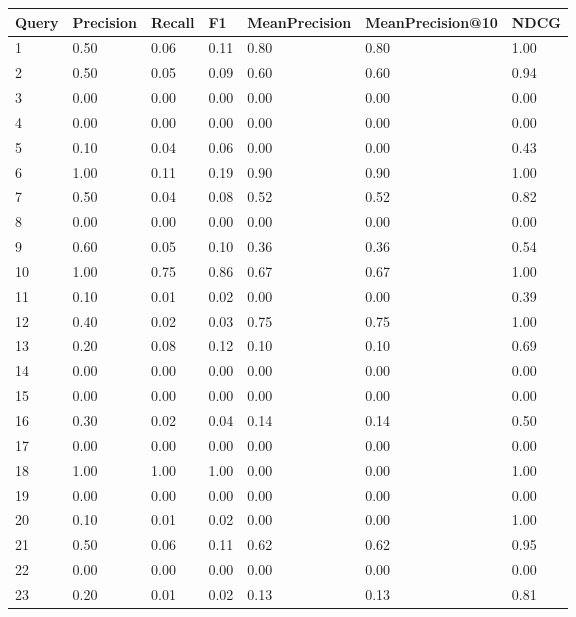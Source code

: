 \documentclass[12pt]{article}
\begin{document}
\begin{longtable}[c]{|l|l|l|l|l|l|l|}
  \hline
  Query & Precision & Recall & F1 & MeanPrecision & MeanPrecision@10 & NDCG \\ \hline
  \endhead
  1 & 0.50 & 0.06 & 0.11 & 0.80 & 0.80 & 1.00 \\ \hline
  2 & 0.50 & 0.05 & 0.09 & 0.60 & 0.60 & 0.94 \\ \hline
  3 & 0.00 & 0.00 & 0.00 & 0.00 & 0.00 & 0.00 \\ \hline
  4 & 0.00 & 0.00 & 0.00 & 0.00 & 0.00 & 0.00 \\ \hline
  5 & 0.10 & 0.04 & 0.06 & 0.00 & 0.00 & 0.43 \\ \hline
  6 & 1.00 & 0.11 & 0.19 & 0.90 & 0.90 & 1.00 \\ \hline
  7 & 0.50 & 0.04 & 0.08 & 0.52 & 0.52 & 0.82 \\ \hline
  8 & 0.00 & 0.00 & 0.00 & 0.00 & 0.00 & 0.00 \\ \hline
  9 & 0.60 & 0.05 & 0.10 & 0.36 & 0.36 & 0.54 \\ \hline
  10 & 1.00 & 0.75 & 0.86 & 0.67 & 0.67 & 1.00 \\ \hline
  11 & 0.10 & 0.01 & 0.02 & 0.00 & 0.00 & 0.39 \\ \hline
  12 & 0.40 & 0.02 & 0.03 & 0.75 & 0.75 & 1.00 \\ \hline
  13 & 0.20 & 0.08 & 0.12 & 0.10 & 0.10 & 0.69 \\ \hline
  14 & 0.00 & 0.00 & 0.00 & 0.00 & 0.00 & 0.00 \\ \hline
  15 & 0.00 & 0.00 & 0.00 & 0.00 & 0.00 & 0.00 \\ \hline
  16 & 0.30 & 0.02 & 0.04 & 0.14 & 0.14 & 0.50 \\ \hline
  17 & 0.00 & 0.00 & 0.00 & 0.00 & 0.00 & 0.00 \\ \hline
  18 & 1.00 & 1.00 & 1.00 & 0.00 & 0.00 & 1.00 \\ \hline
  19 & 0.00 & 0.00 & 0.00 & 0.00 & 0.00 & 0.00 \\ \hline
  20 & 0.10 & 0.01 & 0.02 & 0.00 & 0.00 & 1.00 \\ \hline
  21 & 0.50 & 0.06 & 0.11 & 0.62 & 0.62 & 0.95 \\ \hline
  22 & 0.00 & 0.00 & 0.00 & 0.00 & 0.00 & 0.00 \\ \hline
  23 & 0.20 & 0.01 & 0.02 & 0.13 & 0.13 & 0.81 \\ \hline

\end{longtable}
\end{document}
